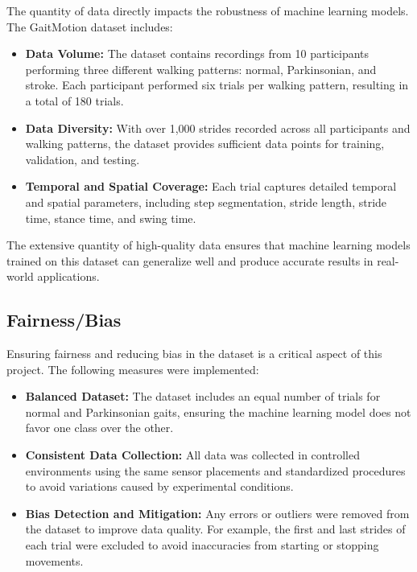 The quantity of data directly impacts the robustness of machine learning models. The GaitMotion dataset includes:

\begin{itemize}
	\item \textbf{Data Volume:}
	The dataset contains recordings from 10 participants performing three different walking patterns: normal, Parkinsonian, and stroke. Each participant performed six trials per walking pattern, resulting in a total of 180 trials.
	
	\item \textbf{Data Diversity:}
	With over 1,000 strides recorded across all participants and walking patterns, the dataset provides sufficient data points for training, validation, and testing.
	
	\item \textbf{Temporal and Spatial Coverage:}
	Each trial captures detailed temporal and spatial parameters, including step segmentation, stride length, stride time, stance time, and swing time.\cite{ZhangWenwen:2022}
\end{itemize}

The extensive quantity of high-quality data ensures that machine learning models trained on this dataset can generalize well and produce accurate results in real-world applications.

\subsection{ Fairness/Bias}

Ensuring fairness and reducing bias in the dataset is a critical aspect of this project. The following measures were implemented:

\begin{itemize}
	\item \textbf{Balanced Dataset:}
	The dataset includes an equal number of trials for normal and Parkinsonian gaits, ensuring the machine learning model does not favor one class over the other.
	
	\item \textbf{Consistent Data Collection:}
	All data was collected in controlled environments using the same sensor placements and standardized procedures to avoid variations caused by experimental conditions.
	
	\item \textbf{Bias Detection and Mitigation:}
	Any errors or outliers were removed from the dataset to improve data quality. For example, the first and last strides of each trial were excluded to avoid inaccuracies from starting or stopping movements.
	
\end{itemize}

